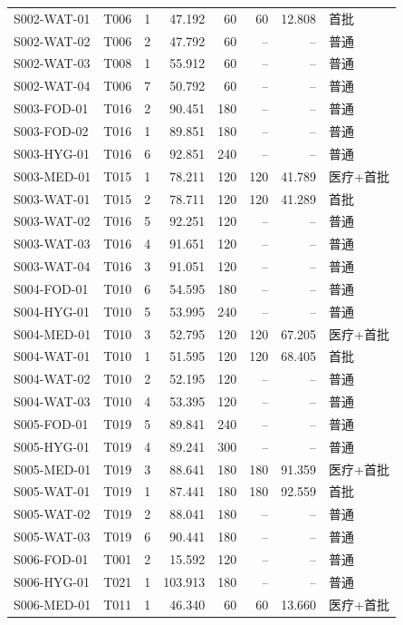 \begin{longtable}{@{}llrrrrrl@{}}
S002-WAT-01 & T006 & 1 & 47.192 & 60 & 60 & 12.808 & 首批 \\
S002-WAT-02 & T006 & 2 & 47.792 & 60 & -- & -- & 普通 \\
S002-WAT-03 & T008 & 1 & 55.912 & 60 & -- & -- & 普通 \\
S002-WAT-04 & T006 & 7 & 50.792 & 60 & -- & -- & 普通 \\
S003-FOD-01 & T016 & 2 & 90.451 & 180 & -- & -- & 普通 \\
S003-FOD-02 & T016 & 1 & 89.851 & 180 & -- & -- & 普通 \\
S003-HYG-01 & T016 & 6 & 92.851 & 240 & -- & -- & 普通 \\
S003-MED-01 & T015 & 1 & 78.211 & 120 & 120 & 41.789 & 医疗+首批 \\
S003-WAT-01 & T015 & 2 & 78.711 & 120 & 120 & 41.289 & 首批 \\
S003-WAT-02 & T016 & 5 & 92.251 & 120 & -- & -- & 普通 \\
S003-WAT-03 & T016 & 4 & 91.651 & 120 & -- & -- & 普通 \\
S003-WAT-04 & T016 & 3 & 91.051 & 120 & -- & -- & 普通 \\
S004-FOD-01 & T010 & 6 & 54.595 & 180 & -- & -- & 普通 \\
S004-HYG-01 & T010 & 5 & 53.995 & 240 & -- & -- & 普通 \\
S004-MED-01 & T010 & 3 & 52.795 & 120 & 120 & 67.205 & 医疗+首批 \\
S004-WAT-01 & T010 & 1 & 51.595 & 120 & 120 & 68.405 & 首批 \\
S004-WAT-02 & T010 & 2 & 52.195 & 120 & -- & -- & 普通 \\
S004-WAT-03 & T010 & 4 & 53.395 & 120 & -- & -- & 普通 \\
S005-FOD-01 & T019 & 5 & 89.841 & 240 & -- & -- & 普通 \\
S005-HYG-01 & T019 & 4 & 89.241 & 300 & -- & -- & 普通 \\
S005-MED-01 & T019 & 3 & 88.641 & 180 & 180 & 91.359 & 医疗+首批 \\
S005-WAT-01 & T019 & 1 & 87.441 & 180 & 180 & 92.559 & 首批 \\
S005-WAT-02 & T019 & 2 & 88.041 & 180 & -- & -- & 普通 \\
S005-WAT-03 & T019 & 6 & 90.441 & 180 & -- & -- & 普通 \\
S006-FOD-01 & T001 & 2 & 15.592 & 120 & -- & -- & 普通 \\
S006-HYG-01 & T021 & 1 & 103.913 & 180 & -- & -- & 普通 \\
S006-MED-01 & T011 & 1 & 46.340 & 60 & 60 & 13.660 & 医疗+首批 \\

\end{longtable}
